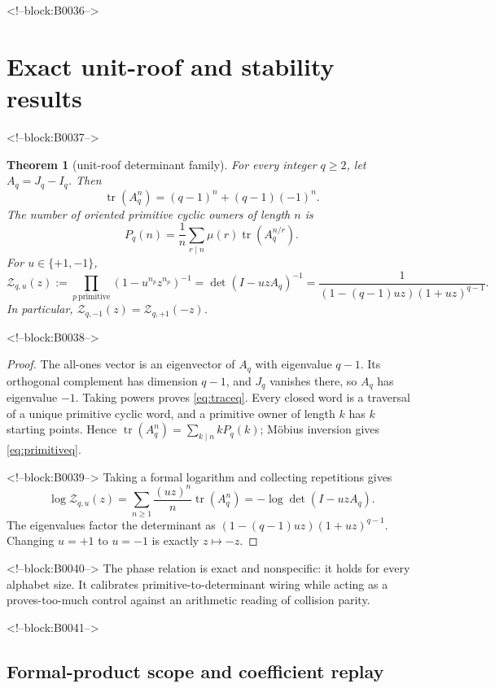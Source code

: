 \documentclass[11pt,a4paper]{article}
\newtheorem{theorem}{Theorem}[section]
\theoremstyle{definition}
\theoremstyle{remark}
\newcommand{\tr}{\operatorname{tr}}
\newcommand{\Zeta}{\mathcal Z}
\begin{document}
<!--block:B0036-->
\section{Exact unit-roof and stability results}

<!--block:B0037-->
\begin{theorem}[unit-roof determinant family]\label{thm:qfamily}
For every integer \(q\ge2\), let \(A_q=J_q-I_q\). Then
\begin{equation}\label{eq:traceq}
 \tr(A_q^n)=(q-1)^n+(q-1)(-1)^n.
\end{equation}
The number of oriented primitive cyclic owners of length \(n\) is
\begin{equation}\label{eq:primitiveq}
 P_q(n)=\frac1n\sum_{r\mid n}\mu(r)\tr(A_q^{n/r}).
\end{equation}
For \(u\in\{+1,-1\}\),
\begin{equation}\label{eq:zetaq}
 \Zeta_{q,u}(z)
 :=\prod_{p\ \mathrm{primitive}}\left(1-u^{n_p}z^{n_p}\right)^{-1}
 =\det(I-uzA_q)^{-1}
 =\frac{1}{(1-(q-1)uz)(1+uz)^{q-1}}.
\end{equation}
In particular, \(\Zeta_{q,-1}(z)=\Zeta_{q,+1}(-z)\).
\end{theorem}

<!--block:B0038-->
\begin{proof}
The all-ones vector is an eigenvector of \(A_q\) with eigenvalue \(q-1\). Its orthogonal complement has dimension \(q-1\), and \(J_q\) vanishes there, so \(A_q\) has eigenvalue \(-1\). Taking powers proves \cref{eq:traceq}. Every closed word is a traversal of a unique primitive cyclic word, and a primitive owner of length \(k\) has \(k\) starting points. Hence
\(\tr(A_q^n)=\sum_{k\mid n}kP_q(k)\); Möbius inversion gives \cref{eq:primitiveq}.

<!--block:B0039-->
Taking a formal logarithm and collecting repetitions gives
\[
 \log\Zeta_{q,u}(z)
 =\sum_{n\ge1}\frac{(uz)^n}{n}\tr(A_q^n)
 =-\log\det(I-uzA_q).
\]
The eigenvalues factor the determinant as
\((1-(q-1)uz)(1+uz)^{q-1}\). Changing \(u=+1\) to \(u=-1\) is exactly \(z\mapsto-z\).
\end{proof}

<!--block:B0040-->
The phase relation is exact and nonspecific: it holds for every alphabet size. It calibrates primitive-to-determinant wiring while acting as a proves-too-much control against an arithmetic reading of collision parity.

<!--block:B0041-->
\subsection{Formal-product scope and coefficient replay}
\end{document}
